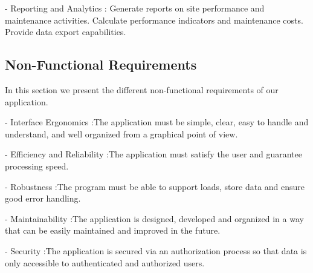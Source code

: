 - Reporting and Analytics : \newline
Generate reports on site performance and maintenance activities.
Calculate performance indicators and maintenance costs.
Provide data export capabilities.

\subsection{Non-Functional Requirements}
In this section we present the different non-functional requirements of our application.\vspace{0.5cm} \newline

- Interface Ergonomics :\newline The application must be simple, clear, easy to handle and understand, and well organized from a graphical point of view.
\vspace{0.5cm} \newline

- Efficiency and Reliability :\newline The application must satisfy the user and guarantee processing speed.
\vspace{0.5cm} \newline

- Robustness :\newline The program must be able to support loads, store data and ensure good error handling.
\vspace{0.5cm} \newline

- Maintainability :\newline The application is designed, developed and organized in a way that can be easily maintained and improved in the future.
\vspace{0.5cm} \newline

- Security :\newline The application is secured via an authorization process so that data is only accessible to authenticated and authorized users.\newline

